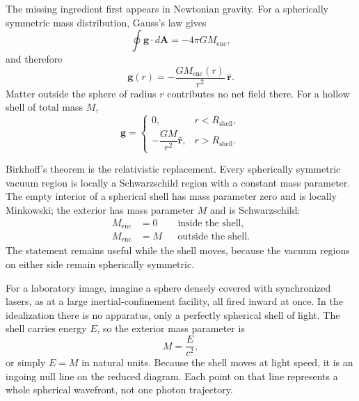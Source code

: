 The missing ingredient first appears in Newtonian gravity. For a spherically symmetric mass distribution, Gauss's law gives
\begin{equation}
\oint\mathbf g\cdot d\mathbf A=-4\pi G M_{\mathrm{enc}},
\end{equation}
and therefore
\begin{equation}
\mathbf g(r)=-\frac{G M_{\mathrm{enc}}(r)}{r^2}\,\hat{\mathbf r}.
\label{eq:l05-shell-theorem}
\end{equation}
Matter outside the sphere of radius \(r\) contributes no net field there. For a hollow shell of total mass \(M\),
\begin{equation}
\mathbf g=
\begin{cases}
0, & r<R_{\mathrm{shell}},\\[3pt]
-\dfrac{GM}{r^2}\hat{\mathbf r}, & r>R_{\mathrm{shell}}.
\end{cases}
\end{equation}

Birkhoff's theorem is the relativistic replacement. Every spherically symmetric vacuum region is locally a Schwarzschild region with a constant mass parameter. The empty interior of a spherical shell has mass parameter zero and is locally Minkowski; the exterior has mass parameter \(M\) and is Schwarzschild:
\begin{equation}
\begin{aligned}
M_{\mathrm{enc}}&=0 && \text{inside the shell},\\
M_{\mathrm{enc}}&=M && \text{outside the shell}.
\end{aligned}
\label{eq:l05-birkhoff}
\end{equation}
The statement remains useful while the shell moves, because the vacuum regions on either side remain spherically symmetric.


For a laboratory image, imagine a sphere densely covered with synchronized lasers, as at a large inertial-confinement facility, all fired inward at once. In the idealization there is no apparatus, only a perfectly spherical shell of light. The shell carries energy \(E\), so the exterior mass parameter is
\begin{equation}
M=\frac{E}{c^2},
\end{equation}
or simply \(E=M\) in natural units. Because the shell moves at light speed, it is an ingoing null line on the reduced diagram. Each point on that line represents a whole spherical wavefront, not one photon trajectory.

